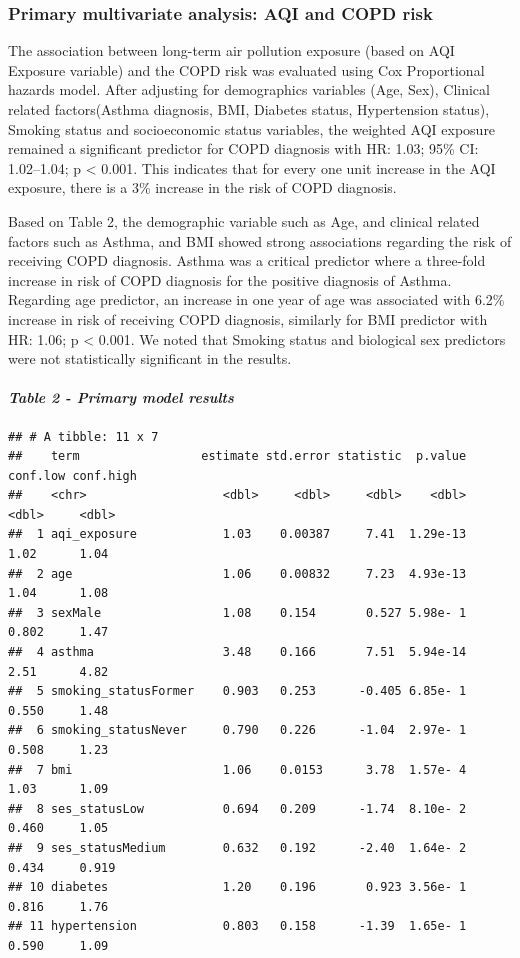 \documentclass[
]{article}
\begin{document}
\subsubsection{Primary multivariate analysis: AQI and COPD
risk}\label{primary-multivariate-analysis-aqi-and-copd-risk}

The association between long-term air pollution exposure (based on AQI
Exposure variable) and the COPD risk was evaluated using Cox
Proportional hazards model. After adjusting for demographics variables
(Age, Sex), Clinical related factors(Asthma diagnosis, BMI, Diabetes
status, Hypertension status), Smoking status and socioeconomic status
variables, the weighted AQI exposure remained a significant predictor
for COPD diagnosis with HR: 1.03; 95\% CI: 1.02--1.04; p \textless{}
0.001. This indicates that for every one unit increase in the AQI
exposure, there is a 3\% increase in the risk of COPD diagnosis.

Based on Table 2, the demographic variable such as Age, and clinical
related factors such as Asthma, and BMI showed strong associations
regarding the risk of receiving COPD diagnosis. Asthma was a critical
predictor where a three-fold increase in risk of COPD diagnosis for the
positive diagnosis of Asthma. Regarding age predictor, an increase in
one year of age was associated with 6.2\% increase in risk of receiving
COPD diagnosis, similarly for BMI predictor with HR: 1.06; p \textless{}
0.001. We noted that Smoking status and biological sex predictors were
not statistically significant in the results.

\paragraph{\texorpdfstring{\emph{Table 2 - Primary model
results}}{Table 2 - Primary model results}}\label{table-2---primary-model-results}

\begin{verbatim}
## # A tibble: 11 x 7
##    term                 estimate std.error statistic  p.value conf.low conf.high
##    <chr>                   <dbl>     <dbl>     <dbl>    <dbl>    <dbl>     <dbl>
##  1 aqi_exposure            1.03    0.00387     7.41  1.29e-13    1.02      1.04 
##  2 age                     1.06    0.00832     7.23  4.93e-13    1.04      1.08 
##  3 sexMale                 1.08    0.154       0.527 5.98e- 1    0.802     1.47 
##  4 asthma                  3.48    0.166       7.51  5.94e-14    2.51      4.82 
##  5 smoking_statusFormer    0.903   0.253      -0.405 6.85e- 1    0.550     1.48 
##  6 smoking_statusNever     0.790   0.226      -1.04  2.97e- 1    0.508     1.23 
##  7 bmi                     1.06    0.0153      3.78  1.57e- 4    1.03      1.09 
##  8 ses_statusLow           0.694   0.209      -1.74  8.10e- 2    0.460     1.05 
##  9 ses_statusMedium        0.632   0.192      -2.40  1.64e- 2    0.434     0.919
## 10 diabetes                1.20    0.196       0.923 3.56e- 1    0.816     1.76 
## 11 hypertension            0.803   0.158      -1.39  1.65e- 1    0.590     1.09
\end{verbatim}
\end{document}
